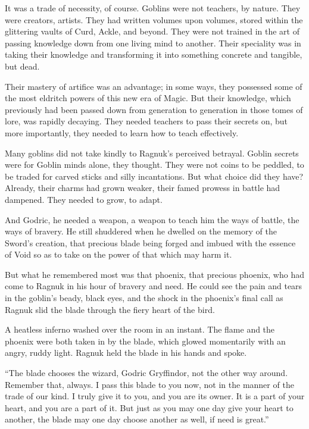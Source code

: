 It was a trade of necessity, of course. Goblins were not teachers, by nature. They were creators, artists. They had written volumes upon volumes, stored within the glittering vaults of Curd, Ackle, and beyond. They were not trained in the art of passing knowledge down from one living mind to another. Their speciality was in taking their knowledge and transforming it into something concrete and tangible, but dead.

Their mastery of artifice was an advantage; in some ways, they possessed some of the most eldritch powers of this new era of Magic. But their knowledge, which previously had been passed down from generation to generation in those tomes of lore, was rapidly decaying. They needed teachers to pass their secrets on, but more importantly, they needed to learn how to teach effectively.

Many goblins did not take kindly to Ragnuk’s perceived betrayal. Goblin secrets were for Goblin minds alone, they thought. They were not coins to be peddled, to be traded for carved sticks and silly incantations. But what choice did they have? Already, their charms had grown weaker, their famed prowess in battle had dampened. They needed to grow, to adapt.

And Godric, he needed a weapon, a weapon to teach him the ways of battle, the ways of bravery. He still shuddered when he dwelled on the memory of the Sword’s creation, that precious blade being forged and imbued with the essence of Void so as to take on the power of that which may harm it.

But what he remembered most was that phoenix, that precious phoenix, who had come to Ragnuk in his hour of bravery and need. He could see the pain and tears in the goblin’s beady, black eyes, and the shock in the phoenix’s final call as Ragnuk slid the blade through the fiery heart of the bird.

A heatless inferno washed over the room in an instant. The flame and the phoenix were both taken in by the blade, which glowed momentarily with an angry, ruddy light. Ragnuk held the blade in his hands and spoke.

“The blade chooses the wizard, Godric Gryffindor, not the other way around. Remember that, always. I pass this blade to you now, not in the manner of the trade of our kind. I truly give it to you, and you are its owner. It is a part of your heart, and you are a part of it. But just as you may one day give your heart to another, the blade may one day choose another as well, if need is great.”

